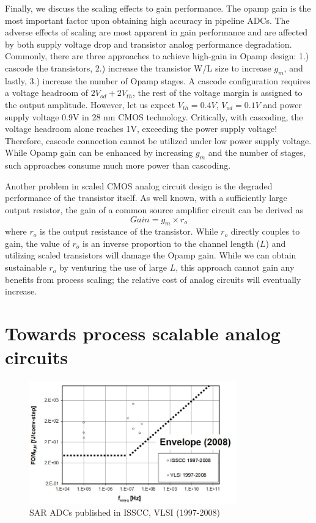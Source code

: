 Finally, we discuss the scaling effects to gain performance. 
The opamp gain is the most important factor upon obtaining high accuracy in pipeline ADCs. 
The adverse effects of scaling are most apparent in gain performance and are affected by both supply voltage drop and transistor analog performance degradation. 
Commonly, there are three approaches to achieve high-gain in Opamp design: 1.) cascode the transistors, 2.) increase the transistor W/L size to increase $g_m$, and lastly, 3.) increase the number of Opamp stages.
A cascode configuration requires a voltage headroom of $2 V_{od} + 2 V_{th}$, the rest of the voltage margin is assigned to the output amplitude. 
However, let us expect $V_{th} = 0.4 V$, $V_{od} = 0.1 V$ and power supply voltage 0.9V in 28 nm CMOS technology.
Critically, with cascoding, the voltage headroom alone reaches 1V, exceeding the power supply voltage! 
Therefore, cascode connection cannot be utilized under low power supply voltage. 
While Opamp gain can be enhanced by increasing $g_m$ and the number of stages, such approaches consume much more power than cascoding.

Another problem in scaled CMOS analog circuit design is the degraded performance of the transistor itself.
As well known, with a sufficiently large output resistor, the gain of a common source amplifier circuit can be derived as 
\begin{equation}
  Gain = g_m \times r_o    
\end{equation}
where $r_o$ is the output resistance of the transistor. While $r_o$ directly couples to gain, the value of $r_o$ is an inverse proportion to the channel length ($L$) and utilizing scaled transistors will damage the Opamp gain.
While we can obtain sustainable $r_o$ by venturing the use of large $L$, this approach cannot gain any benefits from process scaling; the relative cost of analog circuits will eventually increase.

\section{Towards process scalable analog circuits}
\begin{figure}[!]
\centering
  \includegraphics[width=0.8\textwidth]{figure/chap1/sar-performance-2008.jpg}
  \caption{SAR ADCs published in ISSCC, VLSI (1997-2008)}
  \label{sar2008}
\end{figure}

